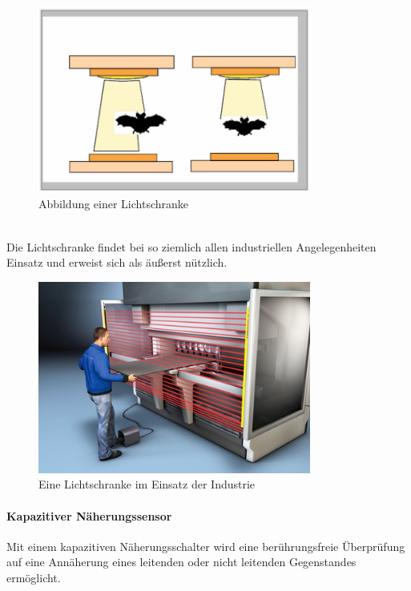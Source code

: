\documentclass[11pt, a4paper]{article}
\begin{document}
\begin{figure}[h!]
		\centering
		\includegraphics[width=0.8\textwidth]{graphics/sensors/lichtschranke}
		\caption{Abbildung einer Lichtschranke\cite{robot-sensors}}
\end{figure} \\
\noindent Die Lichtschranke findet bei so ziemlich allen industriellen Angelegenheiten Einsatz und erweist sich als \"au\ss{}erst n\"utzlich.
\begin{figure}[h!]
		\centering
		\includegraphics[width=0.8\textwidth]{graphics/sensors/lichtschranke-person}
		\caption{Eine Lichtschranke im Einsatz der Industrie\cite{lichtschranke-praxis}}
\end{figure}
\newpage
\paragraph{Kapazitiver N\"aherungssensor}
Mit einem kapazitiven N\"aherungsschalter wird eine ber\"uhrungsfreie \"Uberpr\"ufung auf eine Ann\"aherung eines leitenden oder nicht leitenden Gegenstandes erm\"oglicht.\\\\
\end{document}
